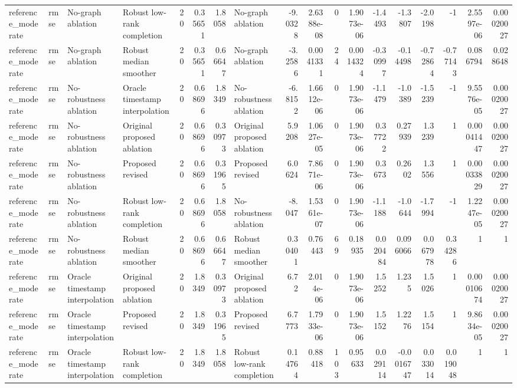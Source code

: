 \begin{table}[!htbp]
{\begin{tabular}{llllrrrlrrrrrrrrrr}
reference_moderate & rmse & No-graph ablation & Robust low-rank completion & 20 & 0.35651 & 1.8058 & No-graph ablation & -9.0328 & 2.6388e-08 & 0 & 1.9073e-06 & -1.4493 & -1.3807 & -2.0198 & -1 & 2.5597e-06 & 0.00020027 \\
reference_moderate & rmse & No-graph ablation & Robust median smoother & 20 & 0.35651 & 0.66647 & No-graph ablation & -3.2586 & 0.0041331 & 24 & 0.0014324 & -0.30997 & -0.14498 & -0.72864 & -0.77143 & 0.086794 & 0.028648 \\
reference_moderate & rmse & No-robustness ablation & Oracle timestamp interpolation & 20 & 0.68696 & 1.8349 & No-robustness ablation & -6.8152 & 1.6612e-06 & 0 & 1.9073e-06 & -1.1479 & -1.0389 & -1.5239 & -1 & 9.5576e-05 & 0.00020027 \\
reference_moderate & rmse & No-robustness ablation & Original proposed ablation & 20 & 0.68696 & 0.30973 & Original proposed ablation & 5.9208 & 1.0627e-05 & 0 & 1.9073e-06 & 0.37722 & 0.27939 & 1.3239 & 1 & 0.00041447 & 0.00020027 \\
reference_moderate & rmse & No-robustness ablation & Proposed revised & 20 & 0.68696 & 0.31965 & Proposed revised & 6.0624 & 7.8671e-06 & 0 & 1.9073e-06 & 0.3673 & 0.2602 & 1.3556 & 1 & 0.00033829 & 0.00020027 \\
reference_moderate & rmse & No-robustness ablation & Robust low-rank completion & 20 & 0.68696 & 1.8058 & No-robustness ablation & -8.047 & 1.5361e-07 & 0 & 1.9073e-06 & -1.1188 & -1.0644 & -1.7994 & -1 & 1.2247e-05 & 0.00020027 \\
reference_moderate & rmse & No-robustness ablation & Robust median smoother & 20 & 0.68696 & 0.66647 & Robust median smoother & 0.30401 & 0.76443 & 69 & 0.18935 & 0.020484 & 0.096066 & 0.067978 & 0.34286 & 1 & 1 \\
reference_moderate & rmse & Oracle timestamp interpolation & Original proposed ablation & 20 & 1.8349 & 0.30973 & Original proposed ablation & 6.72 & 2.014e-06 & 0 & 1.9073e-06 & 1.5252 & 1.235 & 1.5026 & 1 & 0.00010674 & 0.00020027 \\
reference_moderate & rmse & Oracle timestamp interpolation & Proposed revised & 20 & 1.8349 & 0.31965 & Proposed revised & 6.7773 & 1.7933e-06 & 0 & 1.9073e-06 & 1.5152 & 1.2276 & 1.5154 & 1 & 9.8634e-05 & 0.00020027 \\
reference_moderate & rmse & Oracle timestamp interpolation & Robust low-rank completion & 20 & 1.8349 & 1.8058 & Robust low-rank completion & 0.14764 & 0.88418 & 103 & 0.95633 & 0.029114 & -0.0016747 & 0.033014 & 0.019048 & 1 & 1 \\

\end{tabular}}
\end{table}
